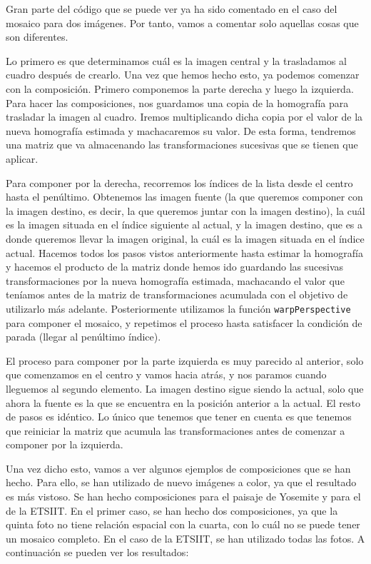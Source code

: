 \documentclass[11pt,a4paper]{article}
\begin{document}
Gran parte del código que se puede ver ya ha sido comentado en el caso del mosaico
para dos imágenes. Por tanto, vamos a comentar solo aquellas cosas que son diferentes.

Lo primero es que determinamos cuál es la imagen central y la trasladamos al cuadro después
de crearlo. Una vez que hemos hecho esto, ya podemos comenzar con la composición. Primero componemos
la parte derecha y luego la izquierda. Para hacer las composiciones, nos guardamos una copia de
la homografía para trasladar la imagen al cuadro. Iremos multiplicando dicha copia por el valor
de la nueva homografía estimada y machacaremos su valor. De esta forma, tendremos una matriz
que va almacenando las transformaciones sucesivas que se tienen que aplicar.

Para componer por la derecha, recorremos los índices de la lista desde el centro hasta el penúltimo.
Obtenemos las imagen fuente (la que queremos componer con la imagen destino, es decir, la que queremos
juntar con la imagen destino), la cuál es la imagen situada en el índice siguiente al actual, y la imagen destino, que es a
donde queremos llevar la imagen original, la cuál es la imagen situada en el índice actual. Hacemos
todos los pasos vistos anteriormente hasta estimar la homografía y hacemos el producto de la matriz
donde hemos ido guardando las sucesivas transformaciones por la nueva homografía estimada, machacando
el valor que teníamos antes de la matriz de transformaciones acumulada con el objetivo de utilizarlo más
adelante. Posteriormente utilizamos la función \texttt{warpPerspective} para componer el mosaico, y
repetimos el proceso hasta satisfacer la condición de parada (llegar al penúltimo índice).

El proceso para componer por la parte izquierda es muy parecido al anterior, solo que comenzamos
en el centro y vamos hacia atrás, y nos paramos cuando lleguemos al segundo elemento. La imagen
destino sigue siendo la actual, solo que ahora la fuente es la que se encuentra en la posición
anterior a la actual. El resto de pasos es idéntico. Lo único que tenemos que tener en cuenta
es que tenemos que reiniciar la matriz que acumula las transformaciones antes de comenzar
a componer por la izquierda.

Una vez dicho esto, vamos a ver algunos ejemplos de composiciones que se han hecho. Para
ello, se han utilizado de nuevo imágenes a color, ya que el resultado es más vistoso. Se han hecho
composiciones para el paisaje de Yosemite y para el de la ETSIIT. En el primer caso, se han hecho
dos composiciones, ya que la quinta foto no tiene relación espacial con la cuarta, con lo cuál no se
puede tener un mosaico completo. En el caso de la ETSIIT, se han utilizado todas las fotos.
A continuación se pueden ver los resultados:
\end{document}
